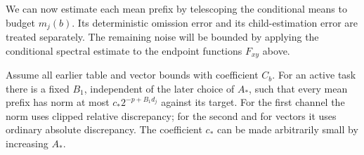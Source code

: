 We can now estimate each mean prefix by telescoping the conditional
means to budget $m_j(b)$.  Its deterministic omission error and its
child-estimation error are treated separately.  The remaining noise
will be bounded by applying the conditional spectral estimate to the
endpoint functions $F_{xy}$ above.

\begin{lemma}\label{lem:est-mean-prefix}
Assume all earlier table and vector bounds with coefficient $C_b$.
For an active task there is a fixed $B_1$, independent of the later
choice of $A_*$, such that every mean prefix has norm at most
$c_*2^{-p+B_1d_j}$ against its target.  For the first channel the norm
uses clipped relative discrepancy; for the second and for vectors it uses
ordinary absolute discrepancy.  The coefficient $c_*$ can be made
arbitrarily small by increasing $A_*$.
\end{lemma}
